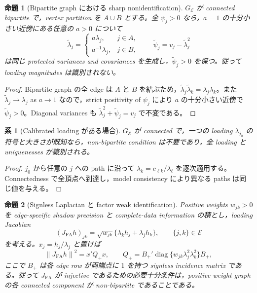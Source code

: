\documentclass[11pt,a4paper]{ltjsarticle}
\newtheorem{proposition}{命題}[section]
\newtheorem{corollary}{系}[section]
\theoremstyle{remark}
\newcommand{\wt}{\widetilde}
\newcommand{\norm}[1]{\left\lVert#1\right\rVert}
\newcommand{\cE}{\mathcal E}
\newcommand{\diag}{\operatorname{diag}}
\begin{document}
\begin{proposition}[Bipartite graph における sharp nonidentification]\label{prop:factorbipartite}
$G_\cE$ が connected bipartite で，vertex partition を $A\cup B$ とする。全 $\psi_j>0$ なら，$a=1$ の十分小さい近傍にある任意の $a>0$ について
\[
\wt\lambda_j=
\begin{cases}
a\lambda_j,&j\in A,\\
a^{-1}\lambda_j,&j\in B,
\end{cases}
\qquad
\wt\psi_j=v_j-\wt\lambda_j^2
\]
は同じ protected variances and covariances を生成し，$\wt\psi_j>0$ を保つ。従って loading magnitudes は識別されない。
\end{proposition}

\begin{proof}
Bipartite graph の全 edge は $A$ と $B$ を結ぶため，$\wt\lambda_j\wt\lambda_k=\lambda_j\lambda_k$。また $\wt\lambda_j\to\lambda_j$ as $a\to1$ なので，strict positivity of $\psi_j$ により $a$ の十分小さい近傍で $\wt\psi_j>0$。Diagonal variances も $\wt\lambda_j^2+\wt\psi_j=v_j$ で不変である。
\end{proof}

\begin{corollary}[Calibrated loading がある場合]\label{cor:factorcalibrated}
$G_\cE$ が connected で，一つの loading $\lambda_{j_0}$ の符号と大きさが既知なら，non-bipartite condition は不要であり，全 loading と uniquenesses が識別される。
\end{corollary}

\begin{proof}
$j_0$ から任意の $j$ への path に沿って $\lambda_k=c_{\ell k}/\lambda_\ell$ を逐次適用する。Connectedness で全頂点へ到達し，model consistency により異なる paths は同じ値を与える。
\end{proof}

\begin{proposition}[Signless Laplacian と factor weak identification]\label{prop:factorsignless}
Positive weights $w_{jk}>0$ を edge-specific shadow precision と complete-data information の積とし，loading Jacobian
\[
(J_{\mathrm{FA}}h)_{jk}
=\sqrt{w_{jk}}\{\lambda_kh_j+\lambda_jh_k\},
\qquad \{j,k\}\in\cE
\]
を考える。$x_j=h_j/\lambda_j$ と置けば
\begin{equation}
\norm{J_{\mathrm{FA}}h}^2
=x'Q_+x,
\qquad
Q_+=B_+'\diag\{w_{jk}\lambda_j^2\lambda_k^2\}B_+,
\label{eq:signlesslaplacian}
\end{equation}
ここで $B_+$ は各 edge row が両端点に $1$ を持つ signless incidence matrix である。従って $J_{\mathrm{FA}}$ が injective であるための必要十分条件は，positive-weight graph の各 connected component が non-bipartite であることである。
\end{proposition}
\end{document}
